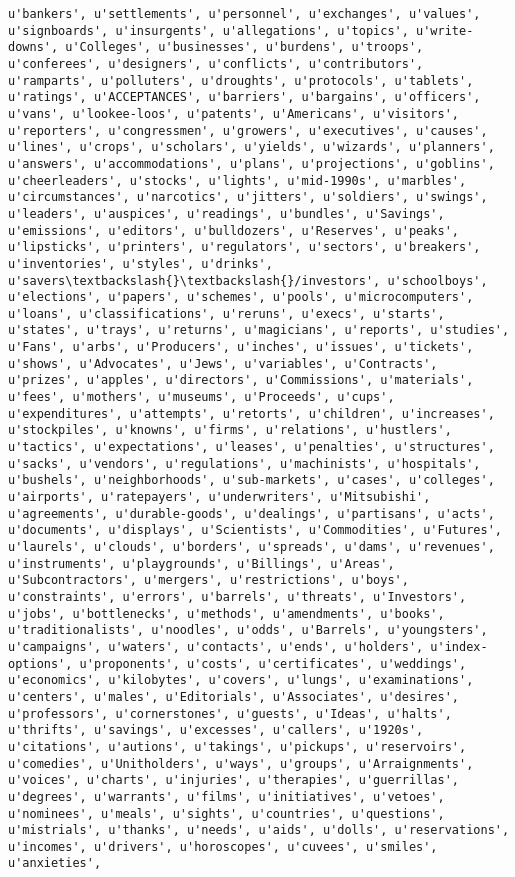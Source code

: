 \documentclass{article}
\begin{document}
\begin{Verbatim}[commandchars=\\\{\}]
u'bankers', u'settlements', u'personnel', u'exchanges', u'values', u'signboards', u'insurgents', u'allegations', u'topics', u'write-downs', u'Colleges', u'businesses', u'burdens', u'troops', u'conferees', u'designers', u'conflicts', u'contributors', u'ramparts', u'polluters', u'droughts', u'protocols', u'tablets', u'ratings', u'ACCEPTANCES', u'barriers', u'bargains', u'officers', u'vans', u'lookee-loos', u'patents', u'Americans', u'visitors', u'reporters', u'congressmen', u'growers', u'executives', u'causes', u'lines', u'crops', u'scholars', u'yields', u'wizards', u'planners', u'answers', u'accommodations', u'plans', u'projections', u'goblins', u'cheerleaders', u'stocks', u'lights', u'mid-1990s', u'marbles', u'circumstances', u'narcotics', u'jitters', u'soldiers', u'swings', u'leaders', u'auspices', u'readings', u'bundles', u'Savings', u'emissions', u'editors', u'bulldozers', u'Reserves', u'peaks', u'lipsticks', u'printers', u'regulators', u'sectors', u'breakers', u'inventories', u'styles', u'drinks', u'savers\textbackslash{}\textbackslash{}/investors', u'schoolboys', u'elections', u'papers', u'schemes', u'pools', u'microcomputers', u'loans', u'classifications', u'reruns', u'execs', u'starts', u'states', u'trays', u'returns', u'magicians', u'reports', u'studies', u'Fans', u'arbs', u'Producers', u'inches', u'issues', u'tickets', u'shows', u'Advocates', u'Jews', u'variables', u'Contracts', u'prizes', u'apples', u'directors', u'Commissions', u'materials', u'fees', u'mothers', u'museums', u'Proceeds', u'cups', u'expenditures', u'attempts', u'retorts', u'children', u'increases', u'stockpiles', u'knowns', u'firms', u'relations', u'hustlers', u'tactics', u'expectations', u'leases', u'penalties', u'structures', u'sacks', u'vendors', u'regulations', u'machinists', u'hospitals', u'bushels', u'neighborhoods', u'sub-markets', u'cases', u'colleges', u'airports', u'ratepayers', u'underwriters', u'Mitsubishi', u'agreements', u'durable-goods', u'dealings', u'partisans', u'acts', u'documents', u'displays', u'Scientists', u'Commodities', u'Futures', u'laurels', u'clouds', u'borders', u'spreads', u'dams', u'revenues', u'instruments', u'playgrounds', u'Billings', u'Areas', u'Subcontractors', u'mergers', u'restrictions', u'boys', u'constraints', u'errors', u'barrels', u'threats', u'Investors', u'jobs', u'bottlenecks', u'methods', u'amendments', u'books', u'traditionalists', u'noodles', u'odds', u'Barrels', u'youngsters', u'campaigns', u'waters', u'contacts', u'ends', u'holders', u'index-options', u'proponents', u'costs', u'certificates', u'weddings', u'economics', u'kilobytes', u'covers', u'lungs', u'examinations', u'centers', u'males', u'Editorials', u'Associates', u'desires', u'professors', u'cornerstones', u'guests', u'Ideas', u'halts', u'thrifts', u'savings', u'excesses', u'callers', u'1920s', u'citations', u'autions', u'takings', u'pickups', u'reservoirs', u'comedies', u'Unitholders', u'ways', u'groups', u'Arraignments', u'voices', u'charts', u'injuries', u'therapies', u'guerrillas', u'degrees', u'warrants', u'films', u'initiatives', u'vetoes', u'nominees', u'meals', u'sights', u'countries', u'questions', u'mistrials', u'thanks', u'needs', u'aids', u'dolls', u'reservations', u'incomes', u'drivers', u'horoscopes', u'cuvees', u'smiles', u'anxieties', 
\end{Verbatim}
\end{document}
